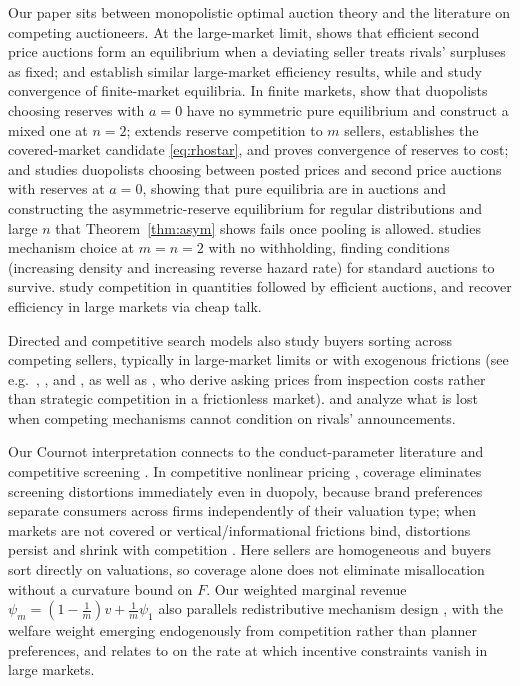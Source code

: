 \documentclass[12pt]{article}
\newcommand{\citeasnoun}[1]{\citet{#1}}
\theoremstyle{mystyle}
\theoremstyle{mystyle2}
\newcommand{\1}{\mathbf{1}}
\begin{document}
Our paper sits between monopolistic optimal auction theory \citep{myerson,bulow1989} and the literature on competing auctioneers. At the large-market limit, \citeasnoun{mcafee} shows that efficient second price auctions form an equilibrium when a deviating seller treats rivals' surpluses as fixed; \citeasnoun{peters} and \citeasnoun{peters1997} establish similar large-market efficiency results, while \citeasnoun{hernando2005} and \citeasnoun{ma2026} study convergence of finite-market equilibria. In finite markets, \citeasnoun{burguet} show that duopolists choosing reserves with $a=0$ have no symmetric pure equilibrium and construct a mixed one at $n=2$; \citeasnoun{virag2010competing} extends reserve competition to $m$ sellers, establishes the covered-market candidate \eqref{eq:rhostar}, and proves convergence of reserves to cost; and \citeasnoun{he2026} studies duopolists choosing between posted prices and second price auctions with reserves at $a=0$, showing that pure equilibria are in auctions and constructing the asymmetric-reserve equilibrium for regular distributions and large $n$ that Theorem~\ref{thm:asym} shows fails once pooling is allowed. \citeasnoun{virag} studies mechanism choice at $m=n=2$ with no withholding, finding conditions (increasing density and increasing reverse hazard rate) for standard auctions to survive. \citeasnoun{moldovanu} study competition in quantities followed by efficient auctions, and \citeasnoun{kim2015} recover efficiency in large markets via cheap talk.

Directed and competitive search models \citep[surveyed in][]{wright2021} also study buyers sorting across competing sellers, typically in large-market limits or with exogenous frictions (see e.g.\ \citeasnoun{burdett2001pricing}, \citeasnoun{eeckhout2010sorting}, and \citeasnoun{albrecht2014}, as well as \citeasnoun{lester2017}, who derive asking prices from inspection costs rather than strategic competition in a frictionless market). \citeasnoun{epstein1999} and \citeasnoun{peters2001common} analyze what is lost when competing mechanisms cannot condition on rivals' announcements.

Our Cournot interpretation connects to the conduct-parameter literature \citep{bresnahan1989,weyl2013} and competitive screening \citep{stole2007}. In competitive nonlinear pricing \citep{armstrong2001,rochet}, coverage eliminates screening distortions immediately even in duopoly, because brand preferences separate consumers across firms independently of their valuation type; when markets are not covered or vertical/informational frictions bind, distortions persist and shrink with competition \citep{yang2008,biais2000,chade2021}. Here sellers are homogeneous and buyers sort directly on valuations, so coverage alone does not eliminate misallocation without a curvature bound on $F$. Our weighted marginal revenue $\psi_m=(1-\frac{1}{m})v+\frac{1}{m}\psi_1$ also parallels redistributive mechanism design \citep{dworczak2021}, with the welfare weight emerging endogenously from competition rather than planner preferences, and relates to \citeasnoun{azevedo2019} on the rate at which incentive constraints vanish in large markets.
\end{document}
